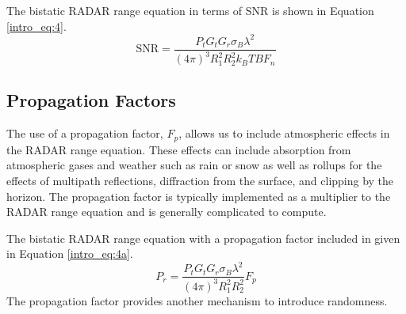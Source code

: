 The bistatic RADAR range equation in terms of SNR is shown in Equation \ref{intro_eq:4}.
\begin{equation}
    \label{intro_eq:4}
\text{SNR} = \frac{P_tG_tG_r\sigma_B\lambda^2}{\left(4\pi\right)^3 R_1^2R_2^2k_BTBF_n}
\end{equation}

\subsection{Propagation Factors}
The use of a propagation factor, $F_p$, allows us to include atmospheric effects in the RADAR range equation. These effects can include absorption from atmospheric gases and weather such as rain or snow as well as rollups for the effects of multipath reflections, diffraction from the surface, and clipping by the horizon. The propagation factor is typically implemented as a multiplier to the RADAR range equation and is generally complicated to compute. 

The bistatic RADAR range equation with a propagation factor included in given in Equation \ref{intro_eq:4a}.
  \begin{equation}
  \label{intro_eq:4a}
 P_r = \frac{P_tG_tG_r\sigma_B\lambda^2}{\left(4\pi\right)^3R_1^2R_2^2}F_p
  \end{equation}
The propagation factor provides another mechanism to introduce randomness.

